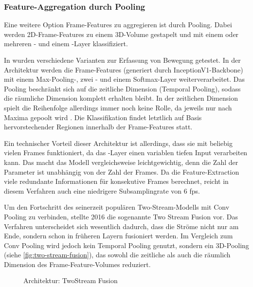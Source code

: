 \subsubsection{Feature-Aggregation durch Pooling}

Eine weitere Option Frame-Features zu aggregieren ist durch Pooling.
Dabei werden 2D-Frame-Features zu einem 3D-Volume gestapelt und mit einem oder mehreren \pool- und einem \fc-Layer klassifiziert.

In \cite{Ng15} wurden verschiedene Varianten zur Erfassung von Bewegung getestet.
In der Architektur werden die Frame-Features (generiert durch InceptionV1-Backbone) mit einem Max-Pooling-, zwei \fc- und einem Softmax-Layer weiterverarbeitet.
Das Pooling beschränkt sich auf die zeitliche Dimension (Temporal Pooling), sodass die räumliche Dimension komplett erhalten bleibt.
In der zeitlichen Dimension spielt die Reihenfolge allerdings immer noch keine Rolle, da jeweils nur nach Maxima gepoolt wird \cite{Carreira17}.
Die Klassifikation findet letztlich auf Basis hervorstechender Regionen innerhalb der Frame-Features statt.


Ein technischer Vorteil dieser Architektur ist allerdings, dass sie mit beliebig vielen Frames funktioniert, da das \pool-Layer einen variablen tiefen Input verarbeiten kann.
Das macht das Modell vergleichsweise leichtgewichtig, denn die Zahl der Parameter ist unabhängig von der Zahl der Frames.
Da die Feature-Extraction viele redundante Informationen für konsekutive Frames berechnet, reicht in diesem Verfahren auch eine niedrigere Subsamplingrate von 6 \gls{fps}.


Um den Fortschritt des seinerzeit populären Two-Stream-Modells mit Conv Pooling zu verbinden, stellte \cite{Feichtenhofer16} 2016 die sogenannte Two Stream Fusion vor.
Das Verfahren unterscheidet sich wesentlich dadurch, dass die Ströme nicht nur am Ende, sondern schon in früheren Layern fusioniert werden.
Im Vergleich zum Conv Pooling wird jedoch kein Temporal Pooling genutzt, sondern ein 3D-Pooling (siehe \autoref{fig:two-stream-fusion}), das sowohl die zeitliche als auch die räumlich Dimension des Frame-Feature-Volumes reduziert.

\begin{figure}[h!]
    \centering
    \caption{Architektur: TwoStream Fusion}
    \label{fig:two-stream-fusion}
\end{figure}

